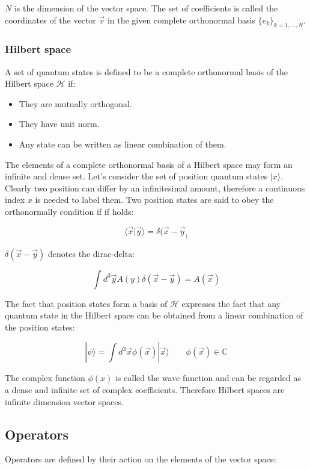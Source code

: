 		$N$ is the dimension of the vector space.
		The set of coefficients is called the coordinates of the vector $\vec{v}$ in the given complete orthonormal basis $\{e_k\}_{k = 1, \dots, N}$.

		\subsubsection{Hilbert space}
		A set of quantum states is defined to be a complete orthonormal basis of the Hilbert space $\mathcal{H}$ if:
		\begin{multicols}{2}
			\begin{itemize}
				\item They are mutually orthogonal.
				\item They have unit norm.
				\item Any state can be written as linear combination of them.
			\end{itemize}
		\end{multicols}

		The elements of a complete orthonormal basis of a Hilbert space may form an infinite and dense set.
		Let's consider the set of position quantum states $|x\rangle$.
		Clearly two position can differ by an infinitesimal amount, therefore a continuous index $x$ is needed to label them.
		Two position states are said to obey the orthonormally condition if if holds:

		$$\langle \vec{x}|\vec{y}\rangle = \delta(\vec{x}-\vec{y}_)$$

		$\delta(\vec{x}-\vec{y})$ denotes the dirac-delta:

		$$\int d^3\vec{y} A(y)\delta(\vec{x}-\vec{y}) = A(\vec{x})$$

		The fact that position states form a basis of $\mathcal{H}$ expresses the fact that any quantum state in the Hilbert space can be obtained from a linear combination of the position states:

		$$|\psi\rangle = \int d^3 \vec{x}\phi(\vec{x})|\vec{x}\rangle\qquad \phi(\vec{x})\in\mathbb{C}$$

		The complex function $\phi(x)$ is called the wave function and can be regarded as a dense and infinite set of complex coefficients.
		Therefore Hilbert spaces are infinite dimension vector spaces.

	\subsection{Operators}
	Operators are defined by their action on the elements of the vector space:


